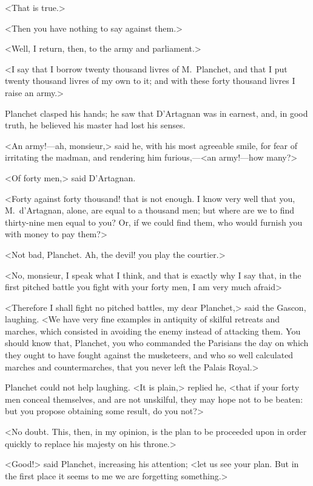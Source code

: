 <That is true.>

<Then you have nothing to say against them.>

<Well, I return, then, to the army and parliament.>

<I say that I borrow twenty thousand livres of M.~Planchet, and that I put twenty thousand livres of my own to it; and with these forty thousand livres I raise an army.>

Planchet clasped his hands; he saw that D'Artagnan was in earnest, and, in good truth, he believed his master had lost his senses.

<An army!—ah, monsieur,> said he, with his most agreeable smile, for fear of irritating the madman, and rendering him furious,—<an army!—how many?>

<Of forty men,> said D'Artagnan.

<Forty against forty thousand! that is not enough. I know very well that you, M.~d'Artagnan, alone, are equal to a thousand men; but where are we to find thirty-nine men equal to you? Or, if we could find them, who would furnish you with money to pay them?>

<Not bad, Planchet. Ah, the devil! you play the courtier.>

<No, monsieur, I speak what I think, and that is exactly why I say that, in the first pitched battle you fight with your forty men, I am very much afraid\longdash>

<Therefore I shall fight no pitched battles, my dear Planchet,> said the Gascon, laughing. <We have very fine examples in antiquity of skilful retreats and marches, which consisted in avoiding the enemy instead of attacking them. You should know that, Planchet, you who commanded the Parisians the day on which they ought to have fought against the musketeers, and who so well calculated marches and countermarches, that you never left the Palais Royal.>

Planchet could not help laughing. <It is plain,> replied he, <that if your forty men conceal themselves, and are not unskilful, they may hope not to be beaten: but you propose obtaining some result, do you not?>

<No doubt. This, then, in my opinion, is the plan to be proceeded upon in order quickly to replace his majesty  on his throne.>

<Good!> said Planchet, increasing his attention; <let us see your plan. But in the first place it seems to me we are forgetting something.>

